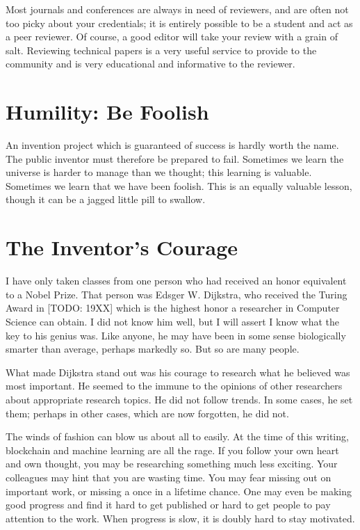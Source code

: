 \documentclass[
	fontsize=10pt, %
	twoside=false, %
	secnumdepth=1, %
]{kaobook}
\begin{document}
Most journals and conferences are always in need of reviewers, and are often not too picky about your credentials;
it is entirely possible to be a student and act as a peer reviewer.
Of course, a good editor will take your review with a grain of salt.
Reviewing technical papers is a very useful service to provide to the community
and is very educational and informative to the reviewer.

\section{Humility: Be Foolish}

An invention project which is guaranteed of success is hardly worth the name.
The public inventor must therefore be prepared to fail.
Sometimes we learn the universe is harder to manage than we thought;
this learning is valuable.
Sometimes we learn that we have been foolish.
This is an equally valuable lesson, though it can be a jagged little pill
to swallow.

\section{The Inventor's Courage}

I have only taken classes from one person who had received an honor equivalent to a Nobel Prize.
That person was Edsger W. Dijkstra, who received the Turing Award in [TODO: 19XX] which is
the highest honor a researcher in Computer Science can obtain.
I did not know him well, but I will assert I know what the key to his genius was.
Like anyone, he may have been in some sense biologically smarter than average, perhaps markedly so.
But so are many people.

What made Dijkstra stand out was his courage to research what he believed was most important.
He seemed to the immune to the opinions of other researchers about appropriate research topics.
He did not follow trends. In some cases, he set them; perhaps in other cases, which are now forgotten,
he did not.

The winds of fashion can blow us about all to easily. At the time of this writing,
blockchain and machine learning are all the rage.
If you follow your own heart and own thought, you may be researching something
much less exciting.
Your colleagues may hint that you are wasting time.
You may fear missing out on important work, or missing a once in a lifetime chance.
One may even be making good progress and find it hard to get published or hard
to get people to pay attention to the work. When progress is slow, it is doubly
hard to stay motivated.
\end{document}
